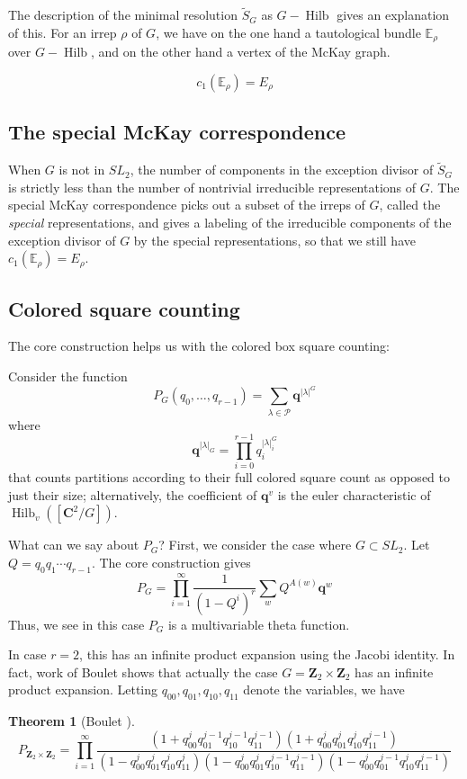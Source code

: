 \documentclass{amsart}[12pt]
\theoremstyle{definition}
\newtheorem{theorem}[dummy]{Theorem}
\newcommand{\Z}{\mathbf{Z}}
\newcommand{\C}{\mathbf{C}}
\DeclareMathOperator{\Hilb}{Hilb}
\begin{document}
The description of the minimal resolution $\widetilde{S}_G$ as $G-\Hilb$ gives an explanation of this.  For an irrep $\rho$ of $G$, we have on the one hand a tautological bundle $\mathbb{E}_\rho$ over $G-\Hilb$, and on the other hand a vertex of the McKay graph.  

$$c_1(\mathbb{E}_\rho)=E_\rho$$

\subsection{The special McKay correspondence}

When $G$ is not in $SL_2$, the number of components in the exception divisor of $\widetilde{S}_G$ is strictly less than the number of nontrivial irreducible representations of $G$.  The special McKay correspondence picks out a subset of the irreps of $G$, called the \emph{special} representations, and gives a labeling of the irreducible components of the exception divisor of $G$ by the special representations, so that we still have $c_1(\mathbb{E}_\rho)=E_\rho$.


\subsection{Colored square counting}

The core construction helps us with the colored box square counting:

Consider the function
$$P_G(q_0,\dots,q_{r-1})=\sum_{\lambda\in\mathcal{P}} \mathbf{q}^{|\lambda|^G}$$
where 
$$\mathbf{q}^{|\lambda|_G}=\prod_{i=0}^{r-1} q_i^{|\lambda|^G_i}$$
that counts partitions according to their full colored square count as opposed to just their size; alternatively, the coefficient of $\mathbf{q}^v$ is the euler characteristic of $\Hilb_v([\C^2/G])$.

What can we say about $P_G$?  First, we consider the case where $G\subset SL_2$.  Let $Q=q_0q_1\cdots q_{r-1}$.  The core construction gives
$$P_G=\prod_{i=1}^\infty\frac{1}{(1-Q^i)^r} \sum_{w} Q^{A(w)}\mathbf{q}^w $$
Thus, we see in this case $P_G$ is a multivariable theta function.

In case $r=2$, this has an infinite product expansion using the Jacobi identity.  In fact, work of Boulet shows that actually the case $G=\Z_2\times \Z_2$ has an infinite product expansion.  Letting $q_{00}, q_{01}, q_{10}, q_{11}$ denote the variables, we have

\begin{theorem}[Boulet \cite{boulet}]
$$P_{\Z_2\times\Z_2}=\prod_{i=1}^\infty \frac{(1+q_{00}^jq_{01}^{j-1}q_{10}^{j-1}q_{11}^{j-1})(1+q_{00}^jq_{01}^jq_{10}^jq_{11}^{j-1})}{(1-q_{00}^jq_{01}^jq_{10}^jq_{11}^j)(1-q_{00}^jq_{01}^jq_{10}^{j-1}q_{11}^{j-1})(1-q_{00}^jq_{01}^{j-1}q_{10}^{j}q_{11}^{j-1})}$$
\end{theorem}
\end{document}
